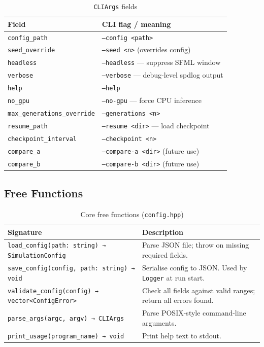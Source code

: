\begin{table}[H]
\centering\small
\caption{\texttt{CLIArgs} fields}
\begin{tabularx}{\textwidth}{@{}lX@{}}
\toprule
\textbf{Field} & \textbf{CLI flag / meaning} \\
\midrule
\texttt{config\_path}               & \texttt{--config <path>} \\
\texttt{seed\_override}             & \texttt{--seed <n>} (overrides config) \\
\texttt{headless}                   & \texttt{--headless} — suppress SFML window \\
\texttt{verbose}                    & \texttt{--verbose} — debug-level spdlog output \\
\texttt{help}                       & \texttt{--help} \\
\texttt{no\_gpu}                    & \texttt{--no-gpu} — force CPU inference \\
\texttt{max\_generations\_override} & \texttt{--generations <n>} \\
\texttt{resume\_path}               & \texttt{--resume <dir>} — load checkpoint \\
\texttt{checkpoint\_interval}       & \texttt{--checkpoint <n>} \\
\texttt{compare\_a}                 & \texttt{--compare-a <dir>} (future use) \\
\texttt{compare\_b}                 & \texttt{--compare-b <dir>} (future use) \\
\bottomrule
\end{tabularx}
\end{table}

\subsection{Free Functions}

\begin{table}[H]
\centering\small
\caption{Core free functions (\texttt{config.hpp})}
\begin{tabularx}{\textwidth}{@{}lX@{}}
\toprule
\textbf{Signature} & \textbf{Description} \\
\midrule
\texttt{load\_config(path: string) → SimulationConfig}
  & Parse JSON file; throw on missing required fields. \\
\texttt{save\_config(config, path: string) → void}
  & Serialise config to JSON. Used by \texttt{Logger} at run start. \\
\texttt{validate\_config(config) → vector<ConfigError>}
  & Check all fields against valid ranges; return all errors found. \\
\texttt{parse\_args(argc, argv) → CLIArgs}
  & Parse POSIX-style command-line arguments. \\
\texttt{print\_usage(program\_name) → void}
  & Print help text to stdout. \\
\bottomrule
\end{tabularx}
\end{table}

